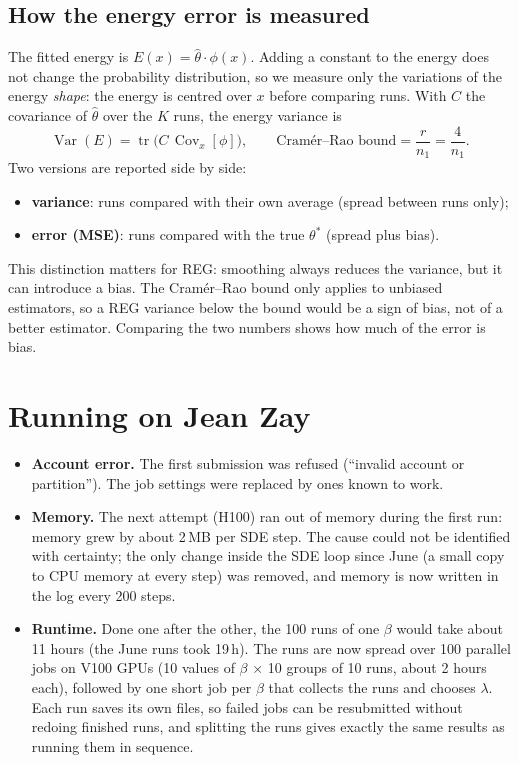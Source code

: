\documentclass[11pt,a4paper]{article}
\begin{document}
\subsection*{How the energy error is measured}
The fitted energy is $E(x) = \hat\theta \cdot \phi(x)$. Adding a constant to the energy does
not change the probability distribution, so we measure only the variations of the energy
\emph{shape}: the energy is centred over $x$ before comparing runs. With $C$ the covariance of
$\hat\theta$ over the $K$ runs, the energy variance is
\[
  \operatorname{Var}(E) = \operatorname{tr}\bigl(C\,\operatorname{Cov}_x[\phi]\bigr),
  \qquad
  \text{Cram\'er--Rao bound} = \frac{r}{n_1} = \frac{4}{n_1}.
\]
Two versions are reported side by side:
\begin{itemize}
  \item \textbf{variance}: runs compared with their own average (spread between runs only);
  \item \textbf{error (MSE)}: runs compared with the true $\theta^*$ (spread plus bias).
\end{itemize}
This distinction matters for REG: smoothing always reduces the variance, but it can introduce
a bias. The Cram\'er--Rao bound only applies to unbiased estimators, so a REG variance below
the bound would be a sign of bias, not of a better estimator. Comparing the two numbers shows
how much of the error is bias.

\section{Running on Jean Zay}
\begin{itemize}
  \item \textbf{Account error.} The first submission was refused (``invalid account or
        partition''). The job settings were replaced by ones known to work.
  \item \textbf{Memory.} The next attempt (H100) ran out of memory during the first run:
        memory grew by about 2\,MB per SDE step. The cause could not be identified with certainty;
        the only change inside the SDE loop since June (a small copy to CPU memory at every step)
        was removed, and memory is now written in the log every 200 steps.
  \item \textbf{Runtime.} Done one after the other, the 100 runs of one $\beta$ would take
        about 11 hours (the June runs took 19\,h). The runs are now spread over
        100 parallel jobs on V100 GPUs (10 values of $\beta$ $\times$ 10 groups of 10 runs,
        about 2 hours each), followed by one short job per $\beta$ that collects the runs and
        chooses $\lambda$. Each run saves its own files, so failed jobs can be resubmitted
        without redoing finished runs, and splitting the runs gives exactly the same results
        as running them in sequence.
\end{itemize}
\end{document}
